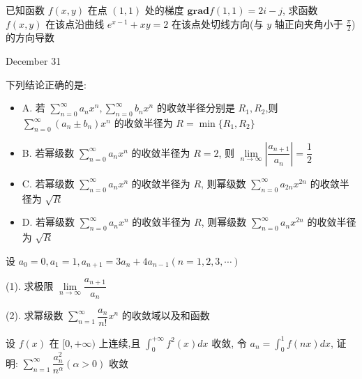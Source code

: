 \begin{solution}
	
\end{solution}

\begin{example}[][Exam: 38.4.21]
	已知函数 $f(x,y)$ 在点 $(1,1)$ 处的梯度 $\mathbf{grad} f(1,1)=2i-j$,
	求函数 $f(x,y)$ 在该点沿曲线 $e^{x-1}+xy=2$ 在该点处切线方向(与 $y$ 轴正向夹角小于 $\frac{\pi}{2}$)的方向导数
\end{example}
\begin{solution}
	
\end{solution}


\textcolor{purplea}{December 31}

\begin{example}[][Exam: 38.4.22]
	下列结论正确的是:
	\begin{itemize}
		\item A. 若 $\sum\limits_{n=0}^{\infty}a_{n}x^{n},\sum\limits_{n=0}^{\infty}b_{n}x^{n}$ 的收敛半径分别是 $R_{1},R_{2}$,则 $\sum\limits_{n=0}^{\infty}(a_{n}\pm b_{n})x^{n}$ 的收敛半径为 $R=\min\{R_{1},R_{2}\}$
		\item B. 若幂级数 $\sum\limits_{n=0}^{\infty}a_{n}x^{n}$ 的收敛半径为 $R=2$, 则 $\lim\limits_{n\to\infty}|\dfrac{a_{n+1}}{a_{n}}|=\dfrac{1}{2}$
		\item C. 若幂级数 $\sum\limits_{n=0}^{\infty}a_{n}x^{n}$ 的收敛半径为 $R$, 则幂级数 $\sum\limits_{n=0}^{\infty}a_{2n}x^{2n}$ 的收敛半径为 $\sqrt{R}$
		\item D. 若幂级数 $\sum\limits_{n=0}^{\infty}a_{n}x^{n}$ 的收敛半径为 $R$, 则幂级数 $\sum\limits_{n=0}^{\infty}a_{n}x^{2n}$ 的收敛半径为 $\sqrt{R}$
	\end{itemize}
\end{example}

\begin{solution}
	
\end{solution}

\begin{example}[][Exam: 38.4.23]
	设 $a_{0}=0, a_{1}=1, a_{n+1}=3a_{n}+4a_{n-1}(n=1,2,3,\cdots)$

(1). 求极限 $\lim\limits_{n\to\infty}\dfrac{a_{n+1}}{a_{n}}$

(2). 求幂级数 $\sum\limits_{n=1}^{\infty}\dfrac{a_{n}}{n!}x^{n}$ 的收敛域以及和函数
\end{example}
\begin{solution}
	
\end{solution}

\begin{example}[][Exam: 38.4.24]
	设 $f(x)$ 在 $[0,+\infty)$ 上连续,且 $\displaystyle{\int_{0}^{+\infty}f^{2}(x)dx}$ 收敛,
	令 $\displaystyle{a_{n}=\int_{0}^{1}f(nx)dx}$,
	证明: $\sum\limits_{n=1}^{\infty}\dfrac{a_{n}^{2}}{n^{\alpha}}(\alpha>0)$ 收敛
\end{example}

\begin{solution}
	
\end{solution}
